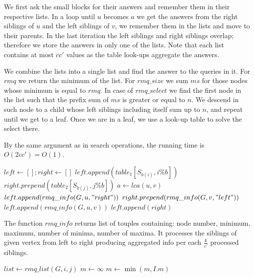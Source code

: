 We first ask the small blocks for their answers and remember them in their respective lists.
In a loop until $u$ becomes $a$ we get the answers from the right siblings of $u$ and the left siblings of $v$, we remember them in the lists and move to their parents.
In the last iteration the left siblings and right siblings overlap; therefore we store the answers in only one of the lists.
Note that each list contains at most $c c'$ values as the table look-ups aggregate the answers.

We combine the lists into a single list and find the answer to the queries in it.
For $rmq$ we return the minimum of the list.
For $rmq\_size$ we sum $ms$ for those nodes whose minimum is equal to $rmq$.
In case of $rmq\_select$ we find the first node in the list such that the prefix sum of $ms$ is greater or equal to $n$.
We descend in such node to a child whose left siblings including itself sum up to $n$, and repeat until we get to a leaf.
Once we are in a leaf, we use a look-up table to solve the select there.

By the same argument as in search operations, the running time is $O(2 c c') = O(1)$.

\begin{algorithmic}
 
	\State $left \gets []; right \gets []$ 
	\State $left.append(table_1[S_{b(i)}, i \% b])$
	\State $right.prepend(table_2[S_{b(j)}, j \% b])$
	\State $a \gets lca(u, v)$
	 
		\State $left.append(rmq\_info(G, u, "right"))$
		\State $right.prepend(rmq\_info(G, v, "left"))$
	\EndWhile
	\State $left.append(rmq\_info(G, u, v))$
	\State $left.append(right)$
	\State {}
\EndFunction
\end{algorithmic}

The function $rmq\_info$ returns list of touples containing: node number, minimum, maximum, number of minima, number of maxima.
It processes the siblings of given vertex from left to right producing aggregated info per each $\frac{k}{c'}$ processed siblings.

\begin{algorithmic}
		\State {}
	\Else
		\State $list \gets rmq\_list(G, i, j)$
		\State $m \gets \infty$
			\State $m \gets \min(m, I.m)$
		\EndFor
		\State {}
	\EndIf
\EndFunction
\end{algorithmic}

